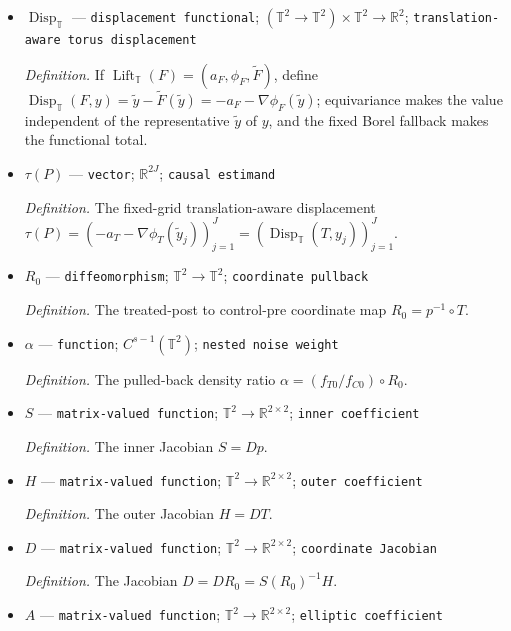 \documentclass{article}
\begin{document}
\begin{itemize}
  \item \(\operatorname{Disp}_{\mathbb T}\) --- \texttt{displacement functional}; \((\mathbb T^2\to\mathbb T^2)\times\mathbb T^2\to\mathbb R^2\); \texttt{translation-\allowbreak{}aware torus displacement}
  \par\smallskip\noindent\emph{Definition.} If \(\operatorname{Lift}_{\mathbb T}(F)=(a_F,\phi_F,\widetilde F)\), define \(\operatorname{Disp}_{\mathbb T}(F,y)=\widetilde y-\widetilde F(\widetilde y)=-a_F-\nabla\phi_F(\widetilde y)\); equivariance makes the value independent of the representative \(\widetilde y\) of \(y\), and the fixed Borel fallback makes the functional total.
  \item \(\tau(P)\) --- \texttt{vector}; \(\mathbb R^{2J}\); \texttt{causal estimand}
  \par\smallskip\noindent\emph{Definition.} The fixed-grid translation-aware displacement \(\tau(P)=(-a_T-\nabla\phi_T(\widetilde y_j))_{j=1}^J=(\operatorname{Disp}_{\mathbb T}(T,y_j))_{j=1}^J\).
  \item \(R_0\) --- \texttt{diffeomorphism}; \(\mathbb T^2\to\mathbb T^2\); \texttt{coordinate pullback}
  \par\smallskip\noindent\emph{Definition.} The treated-post to control-pre coordinate map \(R_0=p^{-1}\circ T\).
  \item \(\alpha\) --- \texttt{function}; \(C^{s-1}(\mathbb T^2)\); \texttt{nested noise weight}
  \par\smallskip\noindent\emph{Definition.} The pulled-back density ratio \(\alpha=(f_{T0}/f_{C0})\circ R_0\).
  \item \(S\) --- \texttt{matrix-\allowbreak{}valued function}; \(\mathbb T^2\to\mathbb R^{2\times2}\); \texttt{inner coefficient}
  \par\smallskip\noindent\emph{Definition.} The inner Jacobian \(S=Dp\).
  \item \(H\) --- \texttt{matrix-\allowbreak{}valued function}; \(\mathbb T^2\to\mathbb R^{2\times2}\); \texttt{outer coefficient}
  \par\smallskip\noindent\emph{Definition.} The outer Jacobian \(H=DT\).
  \item \(D\) --- \texttt{matrix-\allowbreak{}valued function}; \(\mathbb T^2\to\mathbb R^{2\times2}\); \texttt{coordinate Jacobian}
  \par\smallskip\noindent\emph{Definition.} The Jacobian \(D=DR_0=S(R_0)^{-1}H\).
  \item \(A\) --- \texttt{matrix-\allowbreak{}valued function}; \(\mathbb T^2\to\mathbb R^{2\times2}\); \texttt{elliptic coefficient}

\end{itemize}
\end{document}
